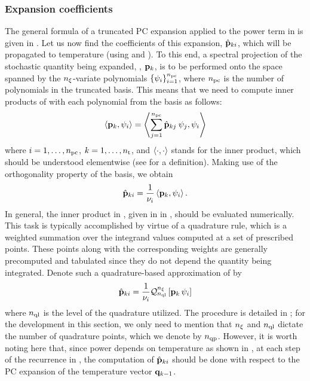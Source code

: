 \subsubsection{Expansion coefficients} 
The general formula of a truncated PC expansion applied to the power term in  is given in .
Let us now find the coefficients of this expansion, $\hat{\mathbf{p}}_{ki}$, which will be propagated to temperature (using  and ).
To this end, a spectral projection of the stochastic quantity being expanded, \ie, $\mathbf{p}_k$, is to be performed onto the space spanned by the ${n_\xi}$-variate polynomials $\{ \psi_i \}_{i = 1}^{{n_\text{pc}}}$, where ${n_\text{pc}}$ is the number of polynomials in the truncated basis.
This means that we need to compute inner products of  with each polynomial from the basis as follows:
\[
  \oInner{\vP_k}{\pcb_i} = \oInner{\sum_{j=1}^{\pcterms} \pcc{\vP}_{kj} \: \pcb_j}{\pcb_i}
\]
where $i = 1, \dotsc, {n_\text{pc}}$, $k = 1, \dotsc, {n_\text{t}}$, and $\oInner{\cdot}{\cdot}$ stands for the inner product, which should be understood elementwise (see  for a definition).
Making use of the orthogonality property of the basis, we obtain
\begin{equation} \elabel{pc-coefficients}
  \pcc{\vP}_{ki} = \frac{1}{\pcn_i} \oInner{\vP_k}{\pcb_i}.
\end{equation}
In general, the inner product in , given in  in , should be evaluated numerically.
This task is typically accomplished by virtue of a quadrature rule, which is a weighted summation over the integrand values computed at a set of prescribed points.
These points along with the corresponding weights are generally precomputed and tabulated since they do not depend the quantity being integrated.
Denote such a quadrature-based approximation of  by
\begin{equation} \elabel{pc-coefficients-quadrature}
  \pcc{\vP}_{ki} = \frac{1}{\pcn_i} \oQuad{\nvars}{\qdlevel}{\vP_k \, \pcb_i}
\end{equation}
where ${n_\text{ql}}$ is the level of the quadrature utilized.
The procedure is detailed in ; for the development in this section, we only need to mention that ${n_\xi}$ and ${n_\text{ql}}$ dictate the number of quadrature points, which we denote by ${n_\text{qp}}$.
However, it is worth noting here that, since power depends on temperature as shown in , at each step of the recurrence in , the computation of $\hat{\mathbf{p}}_{ki}$ should be done with respect to the PC expansion of the temperature vector $\mathbf{q}_{k - 1}$.


